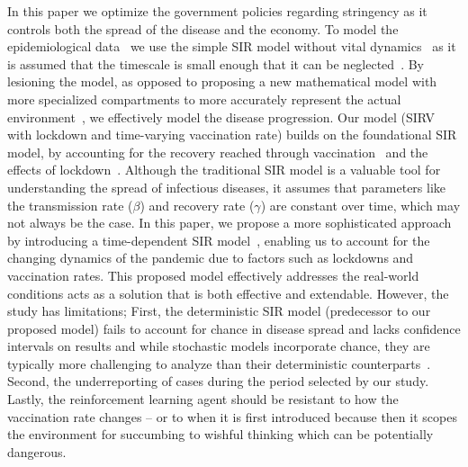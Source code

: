 \documentclass[tikz,fleqn,12pt]{wlscirep}
\begin{document}
In this paper we optimize the government policies regarding stringency as it controls both the spread of the disease and the economy. To model the epidemiological data~\cite{WorldometerCorona} we use the simple SIR model without vital dynamics~\cite{Hethcote1989, Hethcote2008, ALLEN2017128} as it is assumed that the timescale is small enough that it can be neglected~\cite{Cooper2020}. By lesioning the model, as opposed to proposing a new mathematical model with more specialized compartments to more accurately represent the actual environment~\cite{Bjrnstad2020, Mwalili2020}, we effectively model the disease progression. Our model (SIRV with lockdown and time-varying vaccination rate) builds on the foundational SIR model, by accounting for the recovery reached through vaccination~\cite{Marinov2022,MaurciodeCarvalho2023,Thater,Turkyilmazoglu2022,YALADANDA2022101052} and the effects of lockdown~\cite{Hale2021,SIRLockdown,NBERw26981,NBERw26867}. Although the traditional SIR model is a valuable tool for understanding the spread of infectious diseases, it assumes that parameters like the transmission rate ($\beta$) and recovery rate ($\gamma$) are constant over time, which may not always be the case. In this paper, we propose a more sophisticated approach by introducing a time-dependent SIR model~\cite{TimeDependentSIR}, enabling us to account for the changing dynamics of the pandemic due to factors such as lockdowns and vaccination rates. This proposed model effectively addresses the real-world conditions acts as a solution that is both effective and extendable. However, the study has limitations; First, the deterministic SIR model (predecessor to our proposed model) fails to account for chance in disease spread and lacks confidence intervals on results and while stochastic models incorporate chance, they are typically more challenging to analyze than their deterministic counterparts~\cite{Hethcote2008}. Second, the underreporting of cases during the period selected by our study. Lastly, the reinforcement learning agent should be resistant to how the vaccination rate changes -- or to when it is first introduced because then it scopes the environment for succumbing to wishful thinking which can be  potentially dangerous.
\end{document}
